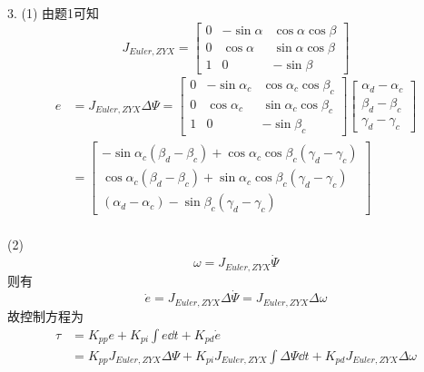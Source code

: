 \documentclass[UTF8, 13pt]{ctexart}
\begin{document}
3.
(1)
由题1可知
\[
J_{Euler, ZYX} = \begin{bmatrix}
                    0 & -\sin\alpha & \cos\alpha \cos\beta \\
                    0 & \cos\alpha & \sin\alpha \cos\beta \\
                    1 & 0 & -\sin\beta
                \end{bmatrix}
\]
\[
\begin{aligned}
    e &= J_{Euler, ZYX} \Delta \Psi
    = \begin{bmatrix}
            0 & -\sin\alpha_c & \cos\alpha_c \cos\beta_c \\
            0 & \cos\alpha_c & \sin\alpha_c \cos\beta_c \\
            1 & 0 & -\sin\beta_c
        \end{bmatrix}
        \begin{bmatrix}
            \alpha_d - \alpha_c \\
            \beta_d - \beta_c \\
            \gamma_d - \gamma_c
        \end{bmatrix} \\
    &= \begin{bmatrix}
            -\sin\alpha_c (\beta_d - \beta_c) + \cos\alpha_c \cos\beta_c (\gamma_d - \gamma_c) \\
            \cos\alpha_c (\beta_d - \beta_c) + \sin\alpha_c \cos\beta_c (\gamma_d - \gamma_c) \\
            (\alpha_d - \alpha_c) - \sin\beta_c (\gamma_d - \gamma_c)
        \end{bmatrix} \\
\end{aligned}
\]

(2)
\[
\omega = J_{Euler, ZYX} \dot{\Psi}
\]
则有
\[
\dot{e} = J_{Euler, ZYX} \Delta\dot{\Psi} = J_{Euler, ZYX} \Delta \omega
\]
故控制方程为
\[
\begin{aligned}
    \tau &= K_{pp}e + K_{pi}\int e \dd t + K_{pd}\dot{e} \\
        &= K_{pp} J_{Euler, ZYX} \Delta \Psi + K_{pi} J_{Euler, ZYX} \int \Delta \Psi \dd t + K_{pd} J_{Euler, ZYX} \Delta \omega
\end{aligned}
\]
\end{document}
